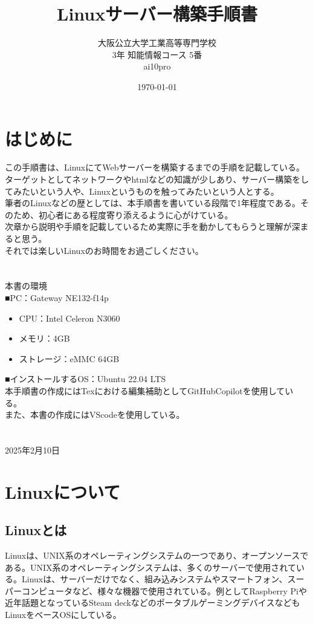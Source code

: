\documentclass[a4paper, 11pt, dvipdfmx]{jsarticle}
\begin{document}
\title{Linuxサーバー構築手順書}
\author{大阪公立大学工業高等専門学校\\
3年 知能情報コース 5番\\
ai10pro
}
\date{\today}
\maketitle\thispagestyle{empty}
\newpage
\tableofcontents

\newpage
\setcounter{section}{-1}

\section{はじめに}
この手順書は、LinuxにてWebサーバーを構築するまでの手順を記載している。ターゲットとしてネットワークやhtmlなどの知識が少しあり、サーバー構築をしてみたいという人や、Linuxというものを触ってみたいという人とする。\\
筆者のLinuxなどの歴としては、本手順書を書いている段階で1年程度である。そのため、初心者にある程度寄り添えるように心がけている。\\
次章から説明や手順を記載しているため実際に手を動かしてもらうと理解が深まると思う。\\
それでは楽しいLinuxのお時間をお過ごしください。
\\\\\\
本書の環境\\
■PC：Gateway NE132-f14p
\begin{itemize}
  \item CPU：Intel Celeron N3060
  \item メモリ：4GB
  \item ストレージ：eMMC 64GB
\end{itemize}
■インストールするOS：Ubuntu 22.04 LTS
\\
本手順書の作成にはTexにおける編集補助としてGitHubCopilotを使用している。\\
また、本書の作成にはVScodeを使用している。\\
\\\\
2025年2月10日

\newpage

\section{Linuxについて}
\subsection{Linuxとは}
Linuxは、UNIX系のオペレーティングシステムの一つであり、オープンソースである。UNIX系のオペレーティングシステムは、多くのサーバーで使用されている。Linuxは、サーバーだけでなく、組み込みシステムやスマートフォン、スーパーコンピュータなど、様々な機器で使用されている。例としてRaspberry Piや近年話題となっているSteam deckなどのポータブルゲーミングデバイスなどもLinuxをベースOSにしている。
\end{document}

